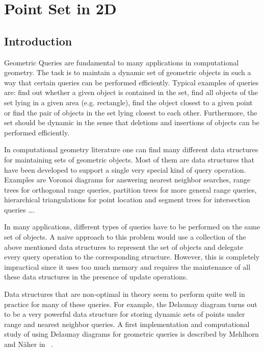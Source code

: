 
\ccParDims

\chapter{Point Set in 2D}
\label{chapterPoint_set_2}


\section{Introduction}

Geometric Queries are fundamental to many applications in computational
geometry. The task is to maintain a dynamic set of geometric objects
in such a way that certain queries can be performed efficiently.
Typical examples of queries are:
find out whether a given object is contained in the set,
find all objects of the set lying in a given area (e.g. rectangle),
find the object closest to a given point or
find the pair of objects in the set lying closest to each other. 
Furthermore, the set should be dynamic in the sense that deletions and 
insertions of objects can be performed efficiently.

In computational geometry literature one can find many different data structures for
maintaining sets of geometric objects. Most of them are data structures 
that have been developed to support a single very special kind of query 
operation.
Examples are Voronoi diagrams for answering nearest neighbor
searches, range trees for orthogonal range queries, partition trees
for more general range queries, hierarchical triangulations for point
location and segment trees for intersection queries \dots.

In many applications, different types of queries have to be
performed on the same set of objects. A naive approach to this
problem would use a collection of the above mentioned data structures to
represent the set of objects and delegate every query operation to
the corresponding structure.
However, this is completely impractical since it uses too much
memory and requires the maintenance of all these data structures in the presence of
update operations.

Data structures that are non-optimal in theory seem to perform quite well in
practice for many of these queries.
For example, the Delaunay diagram turns out to be a very powerful
data structure for storing dynamic sets of points under range and nearest
neighbor queries. A first implementation and computational
study of using Delaunay diagrams for geometric queries is described by
Mehlhorn and N\"aher in ~\cite{LEDAbook}.

